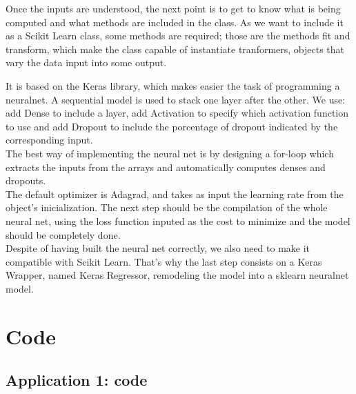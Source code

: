 \documentclass[a4paper,11pt,spanish]{report}
\begin{document}
Once the inputs are understood, the next point is to get to know what is being computed and what methods are included in the class. As we want to include it as a Scikit Learn class, some methods are required; those are the methods fit and transform, which make the class capable of instantiate tranformers, objects that vary the data input into some output.

It is based on the Keras library, which makes easier the task of programming a neuralnet. A sequential model is used to stack one layer after the other. We use: add Dense to include a layer, add Activation to specify which activation function to use and add Dropout to include the porcentage of dropout indicated by the corresponding input.\\
The best way of implementing the neural net is by designing a for-loop which extracts the inputs from the arrays and automatically computes denses and dropouts.\\
The default optimizer is Adagrad, and takes as input the learning rate from the object's inicialization. The next step should be the compilation of the whole neural net, using the loss function inputed as the cost to minimize and the model should be completely done.\\
Despite of having built the neural net correctly, we also need to make it compatible with Scikit Learn. That's why the last step consists on a Keras Wrapper, named Keras Regressor, remodeling the model into a sklearn neuralnet model.


\label{chap:bib}

\nocite{*}

% 


\chapter*{Code}
\label{chap:code}

\section{Application 1: code}
\label{sec:app1code}

\inputminted[baselinestretch=0.5, breaklines]{python}{../code/application1.py}

\end{document}

